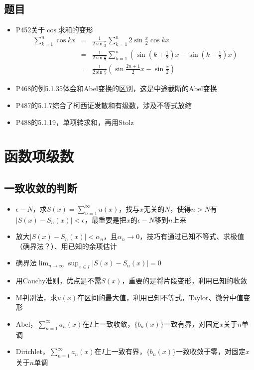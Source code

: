 \documentclass[UTF8]{ctexart}
\begin{document}
\subsection{题目}
\begin{itemize}
\item P452关于$\cos$求和的变形
\begin{eqnarray*}
\sum_{k=1}^n \cos kx &=& \frac{1}{2\sin\frac{x}{2}} \sum_{k=1}^n2\sin\frac{x}{2}\cos kx\\
&=& \frac{1}{2\sin\frac{x}{2}} \sum_{k=1}^n \left( \sin(k+\frac{1}{2})x-\sin(k-\frac{1}{2})x\right)\\
&=& \frac{1}{2\sin\frac{x}{2}} (\sin \frac{2n+1}{2}x-\sin\frac{x}{2})
\end{eqnarray*}

\item P468的例5.1.35体会和Abel变换的区别，这是中途截断的Abel变换

\item P487的5.1.7综合了柯西证发散和有级数，涉及不等式放缩

\item P488的5.1.19，单项转求和，再用Stolz

\end{itemize}

\section{函数项级数}
\subsection{一致收敛的判断}
\begin{itemize}
\item $\epsilon-N$，求$S(x)=\sum_{n=1}^\infty u(x)$，找与$x$无关的$N$，使得$n>N$有$|S(x)-S_n(x)|<\epsilon$，最重要是把$x$的$\epsilon-N$移到$n$上来

\item 放大$|S(x)-S_n(x)|<\alpha_n$，且$\alpha_n\to 0$，技巧有通过已知不等式、求极值（确界法？）、用已知的余项估计
\item 确界法$\lim_{n\to \infty}\sup_{x\in I}|S(x)-S_n(x)|=0$
\item 用Cauchy准则，优点是不需$S(x)$，重要的是将片段变形，利用已知的收敛
\item M判别法，求$u(x)$在区间的最大值，利用已知不等式，Taylor、微分中值变形
\item Abel，$\sum_{n=1}^\infty a_n(x)$在$I$上一致收敛，$\{b_n(x)\}$一致有界，对固定$x$关于$n$单调
\item Dirichlet，$\sum_{n=1}^\infty a_n(x)$在$I$上一致有界，$\{b_n(x)\}$一致收敛于零，对固定$x$关于$n$单调
\end{itemize}
\end{document}
